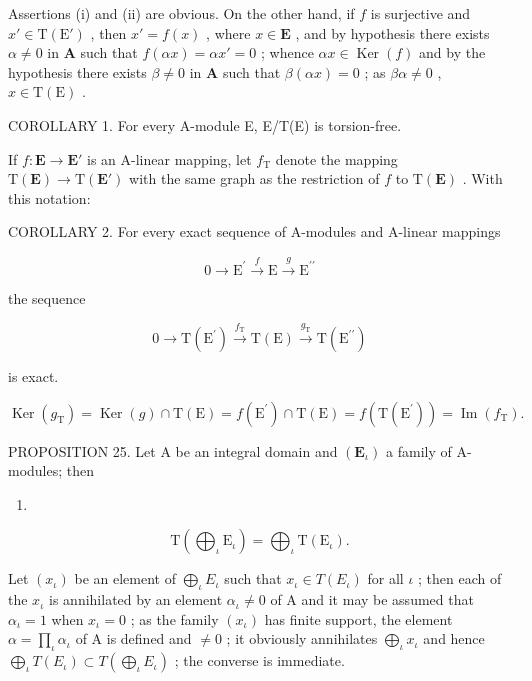 Assertions (i) and (ii) are obvious. On the other hand, if \(f\) is surjective and \(x' \in \mathrm{T}(\mathrm{E}')\) , then \(x' = f(x)\) , where \(x \in \mathbf{E}\) , and by hypothesis there exists \(\alpha \neq 0\) in \(\mathbf{A}\) such that \(f(\alpha x) = \alpha x' = 0\) ; whence \(\alpha x \in \operatorname{Ker}(f)\) and by the hypothesis there exists \(\beta \neq 0\) in \(\mathbf{A}\) such that \(\beta(\alpha x) = 0\) ; as \(\beta \alpha \neq 0\) , \(x \in \mathrm{T}(\mathrm{E})\) .

COROLLARY 1. For every A-module E, E/T(E) is torsion-free.

If \(f: \mathbf{E} \to \mathbf{E}'\) is an A-linear mapping, let \(f_{\mathrm{T}}\) denote the mapping \(\mathrm{T}(\mathbf{E}) \to \mathrm{T}(\mathbf{E}')\) with the same graph as the restriction of \(f\) to \(\mathrm{T}(\mathbf{E})\) . With this notation:

COROLLARY 2. For every exact sequence of A-modules and A-linear mappings

\[
0 \longrightarrow \mathrm{E} ^ {\prime} \stackrel {f} {\longrightarrow} \mathrm{E} \stackrel {g} {\longrightarrow} \mathrm{E} ^ {\prime \prime}
\]

the sequence

\[
0 \longrightarrow \mathrm{T} (\mathrm{E} ^ {\prime}) \xrightarrow {f _ {\mathrm{T}}} \mathrm{T} (\mathrm{E}) \xrightarrow {g _ {\mathrm{T}}} \mathrm{T} (\mathrm{E} ^ {\prime \prime})
\]

is exact.

\[
\operatorname{Ker} \left(g _ {\mathrm{T}}\right) = \operatorname{Ker} (g) \cap \mathrm{T} (\mathrm{E}) = f \left(\mathrm{E} ^ {\prime}\right) \cap \mathrm{T} (\mathrm{E}) = f \left(\mathrm{T} \left(\mathrm{E} ^ {\prime}\right)\right) = \operatorname{Im} \left(f _ {\mathrm{T}}\right).
\]

PROPOSITION 25. Let A be an integral domain and \((\mathbf{E}_{\iota})\) a family of A-modules; then

\begin{enumerate}
\def\labelenumi{(\arabic{enumi})}
\setcounter{enumi}{36}
\tightlist
\item
\end{enumerate}

\[
\mathrm{T} \left(\bigoplus_ {\iota} \mathrm{E} _ {\iota}\right) = \bigoplus_ {\iota} \mathrm{T} (\mathrm{E} _ {\iota}).
\]

Let \((x_{\iota})\) be an element of \(\bigoplus_{\iota} E_{\iota}\) such that \(x_{\iota} \in T(E_{\iota})\) for all \(\iota\) ; then each of the \(x_{\iota}\) is annihilated by an element \(\alpha_{\iota} \neq 0\) of A and it may be assumed that \(\alpha_{\iota} = 1\) when \(x_{\iota} = 0\) ; as the family \((x_{\iota})\) has finite support, the element \(\alpha = \prod_{\iota} \alpha_{\iota}\) of A is defined and \(\neq 0\) ; it obviously annihilates \(\bigoplus_{\iota} x_{\iota}\) and hence \(\bigoplus_{\iota} T(E_{\iota}) \subset T\left(\bigoplus_{\iota} E_{\iota}\right)\) ; the converse is immediate.

